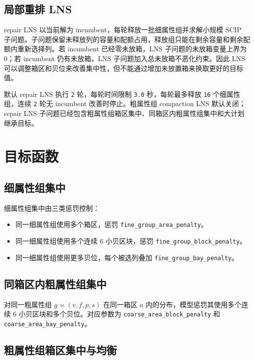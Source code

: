 \documentclass[UTF8,a4paper,11pt]{ctexart}
\newcommand{\code}[1]{\nolinkurl{#1}}
\begin{document}
\subsection{局部重排 LNS}

repair LNS 以当前解为 incumbent，每轮释放一批细属性组并求解小规模 SCIP 子问题。子问题保留未释放列的容量和配额占用，释放组只能在剩余容量和剩余配额内重新选择列。若 incumbent 已经零未放箱，LNS 子问题的未放箱变量上界为 0；若 incumbent 仍有未放箱，LNS 子问题加入总未放箱不恶化约束。因此 LNS 可以调整箱区和贝位来改善集中性，但不能通过增加未放置箱来换取更好的目标值。

默认 repair LNS 执行 \code{2} 轮，每轮时间限制 \code{3.0} 秒，每轮最多释放 \code{16} 个细属性组，连续 \code{2} 轮无 incumbent 改善时停止。粗属性组 compaction LNS 默认关闭；repair LNS 子问题已经包含粗属性组箱区集中、同箱区内粗属性组集中和大计划继承目标。

\section{目标函数}

\subsection{细属性组集中}

细属性组集中由三类惩罚控制：
\begin{itemize}
  \item 同一细属性组使用多个箱区，惩罚 \code{fine_group_area_penalty}。
  \item 同一细属性组使用多个连续 6 小贝区块，惩罚 \code{fine_group_block_penalty}。
  \item 同一细属性组使用更多贝位，每个被选列叠加 \code{fine_group_bay_penalty}。
\end{itemize}

\subsection{同箱区内粗属性组集中}

对同一粗属性组 \(g=(v,f,p,s)\) 在同一箱区 \(a\) 内的分布，模型惩罚其使用多个连续 6 小贝区块和多个贝位。对应参数为
\code{coarse_area_block_penalty} 和 \code{coarse_area_bay_penalty}。

\subsection{粗属性组箱区集中与均衡}
\end{document}
